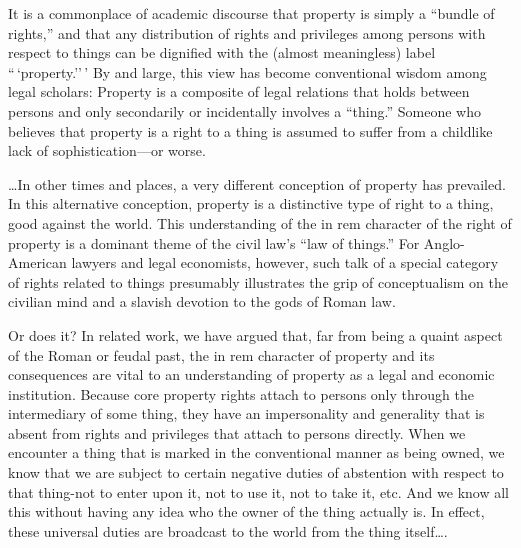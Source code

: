 
It is a commonplace of academic discourse that property is simply a ``bundle of
rights,'' and that any distribution of rights and privileges among persons with
respect to things can be dignified with the (almost meaningless) label
``\,`property.''\,' By and large, this view has become conventional wisdom
among legal scholars: Property is a composite of legal relations that holds
between persons and only secondarily or incidentally involves a ``thing.''
Someone who believes that property is a right to a thing is assumed to suffer
from a childlike lack of sophistication---or worse. 

\ldots In other times and places, a very different conception of property has
prevailed. In this alternative conception, property is a distinctive type of
right to a thing, good against the world. This understanding of the in rem
character of the right of property is a dominant theme of the civil law's ``law
of things.'' For Anglo-American lawyers and legal economists, however, such
talk of a special category of rights related to things presumably illustrates
the grip of conceptualism on the civilian mind and a slavish devotion to the
gods of Roman law.

Or does it? In related work, we have argued that, far from being a quaint aspect
of the Roman or feudal past, the in rem character of property and its
consequences are vital to an understanding of property as a legal and economic
institution. Because core property rights attach to persons
only through the intermediary of some thing, they have an impersonality and
generality that is absent from rights and privileges that attach to persons
directly. When we encounter a thing that is marked in the conventional manner
as being owned, we know that we are subject to certain negative duties of
abstention with respect to that thing-not to enter upon it, not to use it, not
to take it, etc. And we know all this without having any idea who the owner of
the thing actually is. In effect, these universal duties are broadcast to the
world from the thing itself\ldots.


